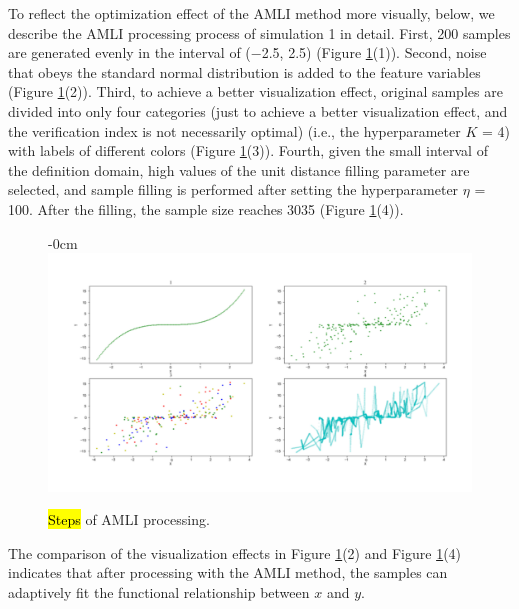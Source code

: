 \documentclass[mathematics,article,accept,pdftex,moreauthors]{Definitions/mdpi}
\begin{document}
To  reflect the optimization effect of the AMLI method more visually, below, we describe the AMLI processing process of simulation 1 in detail. First, 200 samples are generated evenly in the interval of ($-$2.5, 2.5) (Figure \ref{fig:1-}(1)). Second, noise that obeys the standard normal distribution is added to the feature variables (Figure \ref{fig:1-}(2)). Third, to achieve a better visualization effect, original samples are divided into only four categories (just to achieve a better visualization effect, and the verification index is not necessarily optimal) (i.e., the hyperparameter $K$ = 4) with labels of different colors (Figure \ref{fig:1-}(3)). Fourth, given the small interval of the definition domain, high values of the unit distance filling parameter are selected, and sample filling is performed after setting the hyperparameter $\eta$ = 100. After the filling, the sample size reaches 3035 (Figure \ref{fig:1-}(4)).
 \vspace{-6pt}
\begin{figure}[H]
\begin{adjustwidth}{-\extralength}{0cm}\centering
	\includegraphics[width=1\linewidth]{"Figures/第二篇论文图/图1 AMLI方法处理过程"}
	\end{adjustwidth}
	\caption{\hl{Steps} %
	of AMLI processing.\label{fig:1-}}
\end{figure}

The comparison of the visualization effects in Figure  \ref{fig:1-}(2) and Figure  \ref{fig:1-}(4) indicates that after processing with the AMLI method, the samples can adaptively fit the functional relationship between $x$ and $y$.
\end{document}
